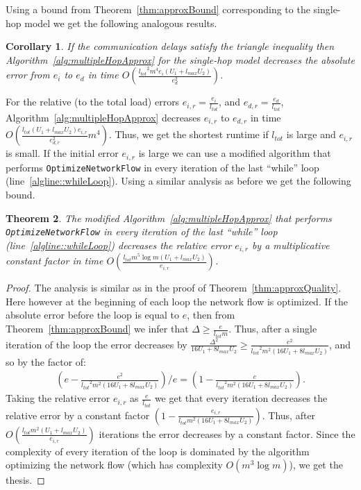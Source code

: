 \documentclass[11pt]{article}
\newcommand{\ltot}{{{l_{\mathit{tot}}}}}
\newcommand{\lmax}{{{l_{\mathit{max}}}}}
\newtheorem{theorem}{Theorem}
\newtheorem{corollary}[theorem]{Corollary}
\begin{document}
Using a bound from Theorem~\ref{thm:approxBound} corresponding to the single-hop model we get the following analogous results.

\begin{corollary}
If the communication delays satisfy the triangle inequality then Algorithm~\ref{alg:multipleHopApprox} for the single-hop model decreases the absolute error from $e_i$ to $e_d$ in time $O(\frac{\ltot^2m^4 e_i(U_1 + \lmax U_2)}{e_d^2})$.
\end{corollary}

For the relative (to the total load) errors $e_{i,r} = \frac{e_i}{\ltot}$, and $e_{d,r} = \frac{e_d}{\ltot}$, Algorithm~\ref{alg:multipleHopApprox} decreases $e_{i,r}$ to $e_{d,r}$ in time $O(\frac{\ltot(U_1 + \lmax U_2)e_{i, r}}{e_{d, r}^2}m^4)$. Thus, we get the shortest runtime if $\ltot$ is large and $e_{i, r}$ is small. If the initial error $e_{i, r}$ is large we can use a modified algorithm that performs \texttt{OptimizeNetworkFlow} in every iteration of the last ``while'' loop (line~\ref{algline::whileLoop}). Using a similar analysis as before we get the following bound.

\begin{theorem}
The modified Algorithm~\ref{alg:multipleHopApprox} that performs \texttt{OptimizeNetworkFlow} in every iteration of the last ``while'' loop (line~\ref{algline::whileLoop}) decreases the relative error $e_{i,r}$ by a multiplicative constant factor in time $O(\frac{\ltot m^5 \log m(U_1 + \lmax U_2)}{e_{i, r}})$.
\end{theorem}
\begin{proof}
The analysis is similar as in the proof of Theorem~\ref{thm:approxQuality}. Here however at the beginning of each loop the network flow is optimized. If the absolute error before the loop is equal to $e$, then from Theorem~\ref{thm:approxBound} we infer that $\Delta \geq \frac{e}{\ltot m}$. Thus, after a single iteration of the loop the error decreases by $\frac{\Delta^2}{16U_1 + 8\lmax U_2} \geq \frac{e^2}{\ltot^2m^2(16U_1 + 8\lmax U_2)}$, and so by the factor of:
\begin{align*}
\left(e - \frac{e^2}{\ltot^2m^2(16U_1 + 8\lmax U_2)}\right)/e = \left(1 - \frac{e}{\ltot^2m^2(16U_1 + 8\lmax U_2)}\right) \text{.}
\end{align*}
Taking the relative error $e_{i,r}$ as $\frac{e}{\ltot}$ we get that every iteration decreases the relative error by a constant factor $\left(1 - \frac{e_{i, r}}{\ltot m^2(16U_1 + 8\lmax U_2)}\right)$.
Thus, after $O(\frac{\ltot m^2(U_1 + \lmax U_2)}{e_{i, r}})$ iterations the error decreases by a constant factor. Since the complexity of every iteration of the loop is dominated by the algorithm optimizing the network flow (which has complexity $O(m^3\log m)$), we get the thesis.
\end{proof}
\end{document}
